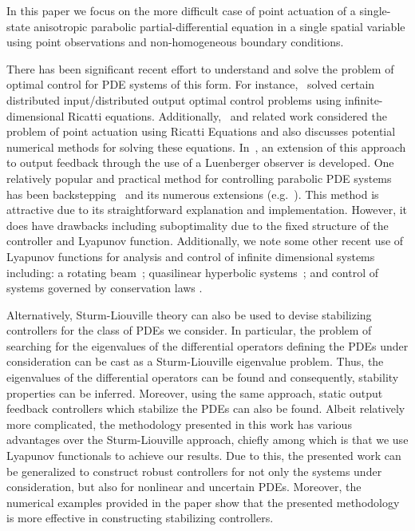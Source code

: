 \documentclass[9pt,journal,twocolumn]{IEEEtran}
\begin{document}
In this paper we focus on the more difficult case of point actuation of a single-state anisotropic parabolic partial-differential equation in a single spatial variable using point observations and non-homogeneous boundary conditions.

There has been significant recent effort to understand and solve the problem of optimal control for PDE systems of this form. For instance,~\cite{van1993h} solved certain distributed input/distributed output optimal control problems using infinite-dimensional Ricatti equations. Additionally,~\cite{lasiecka2000control} and related work considered the problem of point actuation using Ricatti Equations and also discusses potential numerical methods for solving these equations. In~\cite{lasiecka1994control}, an extension of this approach to output feedback through the use of a Luenberger observer is developed. One relatively popular and practical method for controlling parabolic PDE systems has been backstepping~\cite{krstic2008boundary} and its numerous extensions (e.g.~\cite{krstic2008adaptive,smyshlyaev2007adaptive,smyshlyaev2007adaptive2,smyshlyaev2006lyapunov}). This method is attractive due to its straightforward explanation and implementation. However, it does have drawbacks including suboptimality due to the fixed structure of the controller and Lyapunov function.
Additionally, we note some other recent use of Lyapunov functions for analysis and control of infinite dimensional systems including: a rotating beam~\cite{coron1998stabilization}; quasilinear hyperbolic systems~\cite{coron2008dissipative}; and control of systems governed by conservation laws \cite{coron2007strict}.

Alternatively, Sturm-Liouville theory can also be used to devise stabilizing controllers for the class of PDEs we consider. In particular, the problem of searching for the eigenvalues of the differential operators defining the PDEs under consideration can be cast as a Sturm-Liouville eigenvalue problem. Thus, the eigenvalues of the differential operators can be found and consequently, stability properties can be inferred. Moreover, using the same approach, static output feedback controllers which stabilize the PDEs can also be found. Albeit relatively more complicated, the methodology presented in this work has various advantages over the Sturm-Liouville approach, chiefly among which is that we use Lyapunov functionals to achieve our results. Due to this, the presented work can be generalized to construct robust controllers for not only the systems under consideration, but also for nonlinear and uncertain PDEs. Moreover, the numerical examples provided in the paper show that the presented methodology is more effective in constructing stabilizing controllers.    
\end{document}
